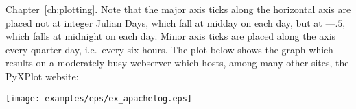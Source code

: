 {Chapter~\ref{ch:plotting}. Note that the major axis ticks along the horizontal
axis are placed not at integer Julian Days, which fall at midday on each day,
but at ---$.5$, which falls at midnight on each day. Minor axis ticks are
placed along the axis every quarter day, i.e.\ every six hours.
\nlscf
{}\newline
{}\newline
{}\newline
{}\newline
{}\newline
{}
\nlscf
The plot below shows the graph which results on a moderately busy webserver
which hosts, among many other sites, the PyXPlot website:
\nlscf
\centerline{\texttt{[image: examples/eps/ex\_apachelog.eps]}}
}

